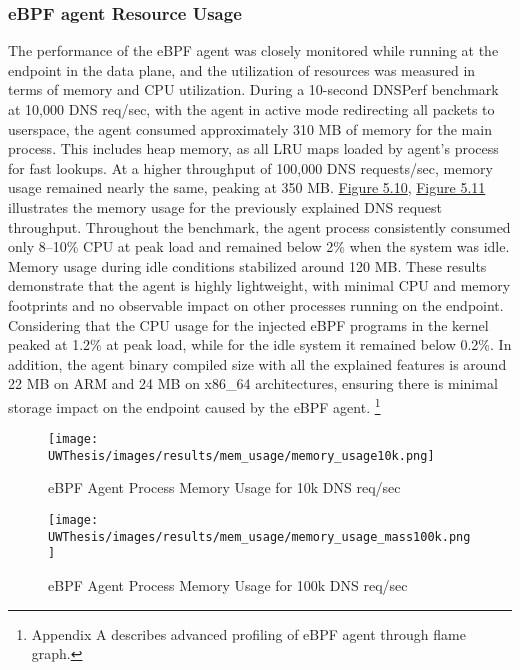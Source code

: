 \documentclass [11pt, proquest] {uwthesis}[2020/02/24]
\begin{document}
\subsubsection{eBPF agent Resource Usage}
The performance of the eBPF agent was closely monitored while running at the endpoint in the data plane, and the utilization of resources was measured in terms of memory and CPU utilization. During a 10-second DNSPerf benchmark at 10,000 DNS req/sec, with the agent in active mode redirecting all packets to userspace, the agent consumed approximately 310 MB of memory for the main process. This includes heap memory, as all LRU maps loaded by agent's process for fast lookups. At a higher throughput of 100,000 DNS requests/sec, memory usage remained nearly the same, peaking at 350 MB. \hyperref[fig:mem10k]{Figure 5.10},  \hyperref[fig:mem100k]{Figure 5.11} illustrates the memory usage for the previously explained DNS request throughput. Throughout the benchmark, the agent process consistently consumed only 8–10\% CPU at peak load and remained below 2\% when the system was idle. Memory usage during idle conditions stabilized around 120 MB. These results demonstrate that the agent is highly lightweight, with minimal CPU and memory footprints and no observable impact on other processes running on the endpoint. Considering that the CPU usage for the injected eBPF programs in the kernel peaked at 1.2\% at peak load, while for the idle system it remained below 0.2\%. In addition, the agent binary compiled size with all the explained features is around 22 MB on ARM and 24 MB on x86\_64 architectures, ensuring there is minimal storage impact on the endpoint caused by the eBPF agent. \footnote{Appendix A describes advanced profiling of eBPF agent through flame graph.}

\begin{figure}[H]
  \centering
  \begin{minipage}[b]{0.48\textwidth}
    \centering
    \texttt{[image: UWThesis/images/results/mem\_usage/memory\_usage10k.png]}
    \caption{eBPF Agent Process Memory Usage for 10k DNS req/sec}
    \label{fig:mem10k}
  \end{minipage}
  \hfill
  \begin{minipage}[b]{0.48\textwidth}
    \centering
    \texttt{[image: UWThesis/images/results/mem\_usage/memory\_usage\_mass100k.png]}
    \caption{eBPF Agent Process Memory Usage for 100k DNS req/sec}
    \label{fig:mem100k}
  \end{minipage}
\end{figure}
\end{document}
